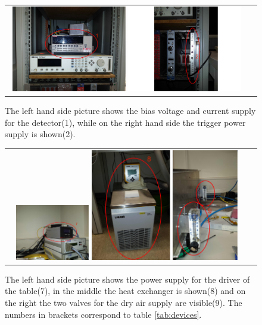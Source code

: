 \documentclass{article}
\begin{document}
\begin{figure}[tbhn]
\begin{center}
\begin{tabular}{cc}
\includegraphics[width=0.48\textwidth]{pictures/1.pdf}
\includegraphics[width=0.48\textwidth]{pictures/2.pdf}
\end{tabular}
\end{center}
\caption{The left hand side picture shows the bias voltage and current supply for the detector(1), while on the right hand side the trigger power supply is shown(2).}
\label{fig:CurrentAndVoltageTrigger}
\end{figure}
\begin{figure}[tbhn]
\begin{center}
\begin{tabular}{cc}
\includegraphics[width=0.31\textwidth]{pictures/7.pdf}
\includegraphics[width=0.62\textwidth]{pictures/89.pdf}
\end{tabular}
\end{center}
\caption{The left hand side picture shows the power supply for the driver of the table(7), in the middle the heat exchanger is shown(8) and on the right the two valves for the dry air supply are visible(9). The numbers in brackets correspond to table \ref{tab:devices}. }
\label{fig:Picture3}
\end{figure}

{}

\end{document}
